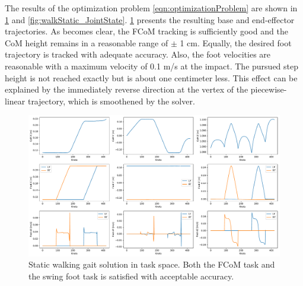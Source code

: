 The results of the optimization problem \cref{eqn:optimizationProblem} are shown in \cref{fig:walkStatic_TaskSpace} and \cref{fig:walkStatic_JointState}.
\cref{fig:walkStatic_TaskSpace} presents the resulting base and end-effector trajectories. As becomes clear, the \gls{FCoM} tracking is sufficiently good and the \gls{CoM} height remains in a reasonable range of $\pm$ 1 cm. Equally, the desired foot trajectory is tracked with adequate accuracy. Also, the foot velocities are reasonable with a maximum velocity of 0.1 m/s at the impact. The pursued step height is not reached exactly but is about one centimeter less. This effect can be explained by the immediately reverse direction at the vertex of the piecewise-linear trajectory, which is smoothened by the solver.
\begin{figure}
\centering	
\includegraphics[width=1\textwidth]{fig/walkStatic/TaskSpace}
\caption[Static walking gait solution in task space]{Static walking gait solution in task space. Both the \gls{FCoM} task and the swing foot task is satisfied with acceptable accuracy.}
\label{fig:walkStatic_TaskSpace}
\end{figure} 

